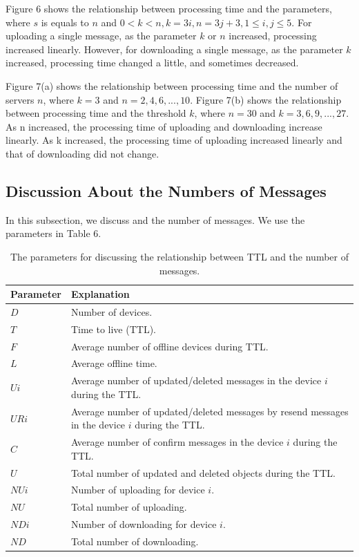 \documentclass[twocolumn,10pt]{article}
\begin{document}
Figure 6 shows the relationship between processing time and the parameters, where $s$ is equals to $n$ and ${0< k < n, k=3i, n=3j+3, 1 \leq i, j \leq 5}$.
For uploading a single message, as the parameter ${k}$ or ${n}$ increased, processing increased linearly.
However, for downloading a single message, as the parameter ${k}$ increased, processing time  changed a little, and sometimes decreased.

Figure 7(a) shows the relationship between processing time and the number of servers ${n}$, where ${k=3}$ and ${n = 2, 4, 6, ... , 10}$. 
Figure 7(b) shows the relationship between processing time and the threshold ${k}$, where ${n=30}$ and ${k = 3, 6, 9, ... , 27}$. 
As n increased, the processing time of uploading and downloading increase linearly. 
As k increased, the processing time of uploading increased linearly and that of downloading did not change. 

\subsection{Discussion About the Numbers of Messages}

In this subsection, we discuss and the number of messages. 
We use the parameters in Table 6.

\begin{table}[t]
	\centering
	\caption{The parameters for discussing the relationship between TTL and the number of messages.}
	\begin{tabular}{ll}
		\hline
		\textbf{Parameter} & \textbf{Explanation} \\ \hline
		$D$ & Number of devices. \\
		$T$ & Time to live (TTL). \\
		$F$ & Average number of offline devices during TTL. \\
		$L$ & Average offline time. \\
		$Ui$ & Average number of updated/deleted messages in the device $i$ during the TTL. \\ 
		$URi$ &  Average number of updated/deleted messages by resend messages in the device $i$ during the TTL.\\ 
		$C$ & Average number of confirm messages in the device $i$ during the TTL. \\ 
		$U$ & Total number of updated and deleted objects during the TTL. \\ 
		$NUi$ & Number of uploading for device $i$. \\
		$NU$ & Total number of uploading. \\
		$NDi$ & Number of downloading for device $i$. \\
		$ND$ & Total number of downloading. \\ \hline
	\end{tabular}
\end{table}
\end{document}
